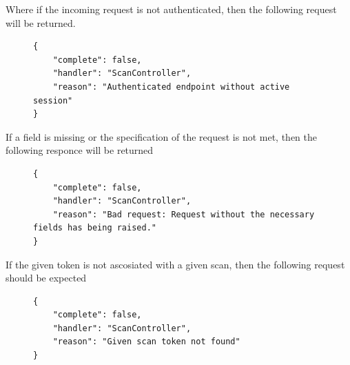 					Where if the incoming request is not authenticated, then the following request will be returned.
					\begin{figure}[H]
						\iftrue
						\begin{lstlisting}[]
{
	"complete": false,
	"handler": "ScanController",
	"reason": "Authenticated endpoint without active session"
}
						\end{lstlisting}
					\end{figure}
					If a field is missing or the specification of the request is not met, then the following responce will be returned
					\begin{figure}[H]
						\iftrue
						\begin{lstlisting}[]
{
	"complete": false,
	"handler": "ScanController",
	"reason": "Bad request: Request without the necessary fields has being raised."
}					
						\end{lstlisting}
					\end{figure}
					If the given token is not ascosiated with a given scan, then the following request should be expected
					\begin{figure}[H]
						\iftrue
						\begin{lstlisting}[]
{
	"complete": false,
	"handler": "ScanController",
	"reason": "Given scan token not found"
}		
						\end{lstlisting}
					\end{figure}
					
